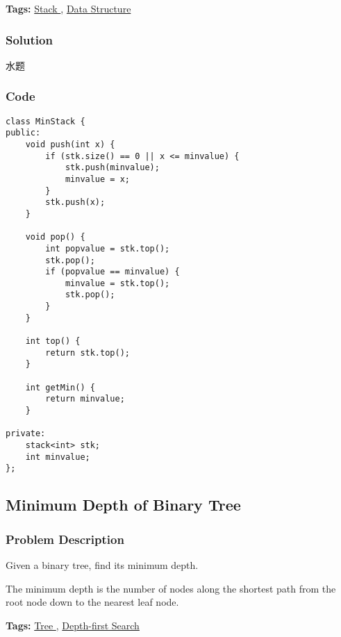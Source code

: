 \documentclass{article}
\begin{document}
\begin{CJK*}{UTF8}{gkai}
\begin{itemize}
\end{itemize}


\textbf{Tags: }
\hyperref[ Stack ]{ Stack },  \hyperref[ Data Structure ]{ Data Structure }



\subsubsection*{Solution}
水题

\subsubsection*{Code}
\begin{lstlisting}
class MinStack {
public:
    void push(int x) {
        if (stk.size() == 0 || x <= minvalue) {
            stk.push(minvalue);
            minvalue = x;
        }
        stk.push(x);
    }
    
    void pop() {
        int popvalue = stk.top();
        stk.pop();
        if (popvalue == minvalue) {
            minvalue = stk.top();
            stk.pop();
        }
    }
    
    int top() {
        return stk.top();
    }
    
    int getMin() {
        return minvalue;
    }
    
private:
    stack<int> stk;
    int minvalue;
}; 
\end{lstlisting}


\subsection{ Minimum Depth of Binary Tree }
\label{ Minimum Depth of Binary Tree }

\subsubsection*{Problem Description}
Given a binary tree, find its minimum depth.

The minimum depth is the number of nodes along the shortest path from the root node down to the nearest leaf node.


\textbf{Tags: }
\hyperref[ Tree ]{ Tree },  \hyperref[ Depth-first Search ]{ Depth-first Search }




\end{CJK*}
\end{document}

